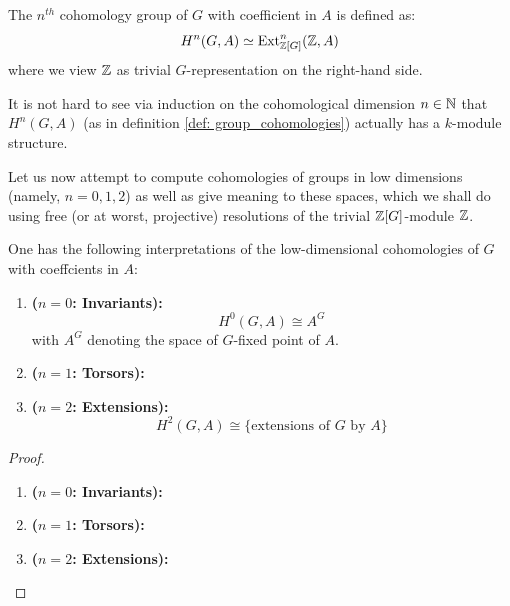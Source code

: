                 \begin{definition} \label{def: group_cohomologies}
                    The $n^{th}$ cohomology group of $G$ with coefficient in $A$ is defined as:
                        $$H^n(G, A) \simeq \mathrm{Ext}^n_{\mathbb{Z}[G]}(\mathbb{Z}, A)$$
                    where we view $\mathbb{Z}$ as trivial $G$-representation on the right-hand side. 
                \end{definition}
                \begin{remark}
                    It is not hard to see via induction on the cohomological dimension $n \in \mathbb{N}$ that $H^n(G, A)$ (as in definition \ref{def: group_cohomologies}) actually has a $k$-module structure.
                \end{remark}
                
                Let us now attempt to compute cohomologies of groups in low dimensions (namely, $n = 0, 1, 2$) as well as give meaning to these spaces, which we shall do using free (or at worst, projective) resolutions of the trivial $\mathbb{Z}[G]$-module $\mathbb{Z}$.
                \begin{proposition} \label{prop: low_dimensional_cohomologies_of_groups}
                    One has the following interpretations of the low-dimensional cohomologies of $G$ with coeffcients in $A$:
                    \begin{enumerate}
                        \item \textbf{($n = 0$: Invariants):}
                            $$H^0(G, A) \cong A^G$$
                        with $A^G$ denoting the space of $G$-fixed point of $A$.
                        \item \textbf{($n = 1$: Torsors):} 
                        \item \textbf{($n = 2$: Extensions):} 
                            $$H^2(G, A) \cong \{\text{extensions of $G$ by $A$}\}$$
                    \end{enumerate}
                \end{proposition}
                    \begin{proof}
                        \noindent
                        \begin{enumerate}
                            \item \textbf{($n = 0$: Invariants):}
                            \item \textbf{($n = 1$: Torsors):}
                            \item \textbf{($n = 2$: Extensions):}
                        \end{enumerate}
                    \end{proof}
                \begin{example}
                                
                \end{example}
            
